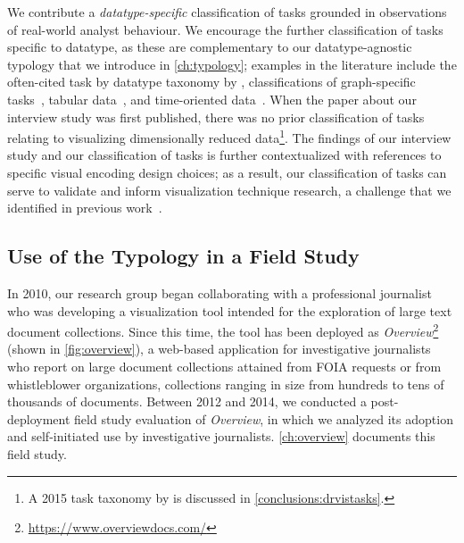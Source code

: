 \begin{sloppypar}
We contribute a {\it datatype-specific} classification of tasks grounded in observations of real-world analyst behaviour.
We encourage the further classification of tasks specific to datatype, as these are complementary to our datatype-agnostic typology that we introduce in \autoref{ch:typology}; examples in the literature include the often-cited task by datatype taxonomy by \citet{Shneiderman1996}, classifications of graph-specific tasks~\cite{Lee2006,Saket2014}, tabular data~\cite{Henry2006}, and time-oriented data~\cite{Lammarsch2012}.
When the paper about our interview study was first published, there was no prior classification of tasks relating to visualizing dimensionally reduced data\footnote{A 2015 task taxonomy by \citet{Etemadpour2015} is discussed in \autoref{conclusions:drvistasks}.}.
The findings of our interview study and our classification of tasks is further contextualized with references to specific visual encoding design choices; as a result, our classification of tasks can serve to validate and inform visualization technique research, a challenge that we identified in previous work~\cite{Ingram2010}.
\end{sloppypar}


\subsection{Use of the Typology in a Field Study}
\label{intro:p3}


In 2010, our research group began collaborating with a professional journalist who was developing a visualization tool intended for the exploration of large text document collections.
Since this time, the tool has been deployed as {\it Overview}\footnote{\url{https://www.overviewdocs.com/}} (shown in \autoref{fig:overview}), a web-based application for investigative journalists who report on large document collections attained from \ac{FOIA} requests or from whistleblower organizations, collections ranging in size from hundreds to tens of thousands of documents.
Between 2012 and 2014, we conducted a post-deployment field study evaluation of {\it Overview}, in which we analyzed its adoption and self-initiated use by investigative journalists.
\autoref{ch:overview} documents this field study.

